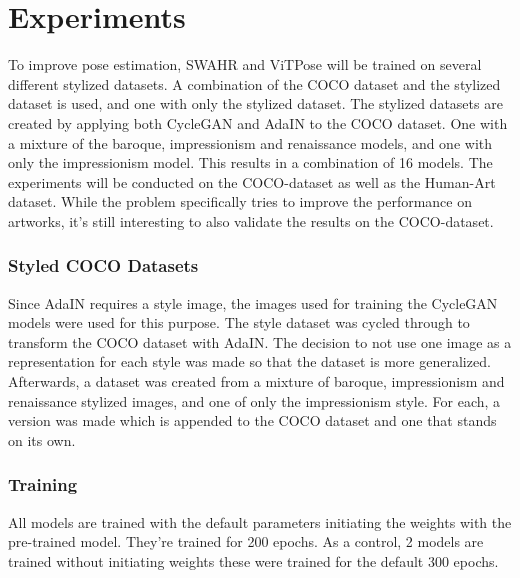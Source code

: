 \documentclass[conference]{IEEEtran}
\begin{document}
\section{Experiments}
To improve pose estimation, SWAHR and ViTPose will be trained on several different stylized datasets.
A combination of the COCO dataset and the stylized dataset is used, and one with only the stylized dataset.
The stylized datasets are created by applying both CycleGAN and AdaIN to the COCO dataset.
One with a mixture of the baroque, impressionism and renaissance models, and one with only the impressionism model.
This results in a combination of 16 models.
The experiments will be conducted on the COCO-dataset as well as the Human-Art dataset.
While the problem specifically tries to improve the performance on artworks, it's still interesting to also validate the results on the COCO-dataset.

\subsubsection{Styled COCO Datasets}
Since AdaIN requires a style image, the images used for training the CycleGAN models were used for this purpose.
The style dataset was cycled through to transform the COCO dataset with AdaIN.
The decision to not use one image as a representation for each style was made so that the dataset is more generalized.
Afterwards, a dataset was created from a mixture of baroque, impressionism and renaissance stylized images, and one of only the impressionism style.
For each, a version was made which is appended to the COCO dataset and one that stands on its own.

\subsubsection{Training}
All models are trained with the default parameters initiating the weights with the pre-trained model.
They're trained for 200 epochs.
As a control, 2 models are trained without initiating weights these were trained for the default 300 epochs.
\end{document}
